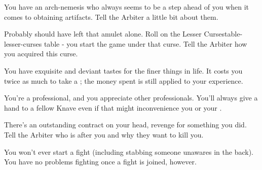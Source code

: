
    
    You have an arch-nemesis who always seems to be a step ahead of you when it comes to obtaining artifacts. Tell the Arbiter a little bit about them.


    Probably should have left that amulet alone.  Roll on the {Lesser Curses}{table-lesser-curses} table - you start the game under that curse.  Tell the Arbiter how you acquired this curse.


    You have exquisite and deviant tastes for the finer things in life. It costs you twice as much to take a ; the money spent is still applied to your experience.


    You're a professional, and you appreciate other professionals.  You'll always give a hand to a fellow Knave even if that might inconvenience you or your .


    There's an outstanding contract on your head, revenge for something you did.  Tell the Arbiter who is after you and why they want to kill you.


    You won't ever start a fight (including stabbing someone unawares in the back).  You have no problems fighting once a fight is joined, however.  


